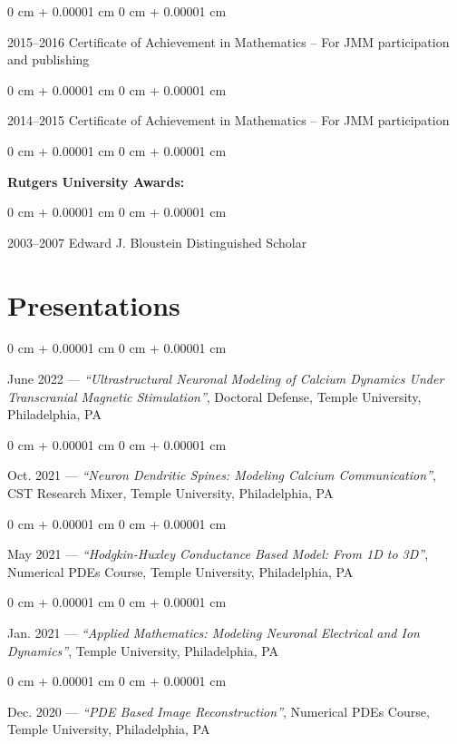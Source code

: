 \documentclass[10pt, letterpaper]{article}
\newenvironment{onecolentry}{
    \begin{adjustwidth}{
        0 cm + 0.00001 cm
    }{
        0 cm + 0.00001 cm
    }
}{
    \end{adjustwidth}
} %
\begin{document}
\begin{onecolentry}
    2015–2016 Certificate of Achievement in Mathematics – For JMM participation and publishing
\end{onecolentry}

\begin{onecolentry}
    2014–2015 Certificate of Achievement in Mathematics – For JMM participation
\end{onecolentry}

\vspace{0.3 cm}

\begin{onecolentry}
    \textbf{Rutgers University Awards:}
\end{onecolentry}

\vspace{0.1 cm}

\begin{onecolentry}
    2003–2007 Edward J. Bloustein Distinguished Scholar
\end{onecolentry}

\section{Presentations}

\begin{onecolentry}
    June 2022 — \textit{“Ultrastructural Neuronal Modeling of Calcium Dynamics Under Transcranial Magnetic Stimulation”}, Doctoral Defense, Temple University, Philadelphia, PA
\end{onecolentry}

\begin{onecolentry}
    Oct. 2021 — \textit{“Neuron Dendritic Spines: Modeling Calcium Communication”}, CST Research Mixer, Temple University, Philadelphia, PA
\end{onecolentry}

\begin{onecolentry}
    May 2021 — \textit{“Hodgkin-Huxley Conductance Based Model: From 1D to 3D”}, Numerical PDEs Course, Temple University, Philadelphia, PA
\end{onecolentry}

\begin{onecolentry}
    Jan. 2021 — \textit{“Applied Mathematics: Modeling Neuronal Electrical and Ion Dynamics”}, Temple University, Philadelphia, PA
\end{onecolentry}

\begin{onecolentry}
    Dec. 2020 — \textit{“PDE Based Image Reconstruction”}, Numerical PDEs Course, Temple University, Philadelphia, PA
\end{onecolentry}
\end{document}
